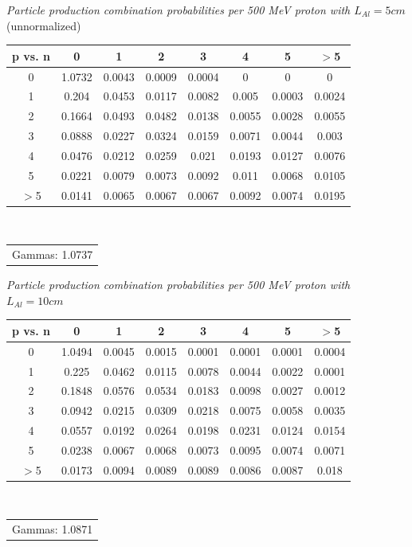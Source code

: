 \documentclass[11pt]{article}
\makeatletter
\newenvironment{tablehere}
{\def\@captype{table}}{}
\makeatother
\begin{document}
\vspace{0.15 cm}
\begin{tablehere}\begin{centering}
  \caption{\small \emph{Particle production combination probabilities per 500 MeV proton with $L_{Al}=5 cm$} (unnormalized)}
  \begin{tabular}{c || c c c c c c c}
    p vs. n & 0 & 1 & 2 & 3 & 4 & 5 & $>$5 \\
    \hline\hline
    0 & 1.0732 & 0.0043 & 0.0009 & 0.0004 & 0 & 0 & 0 \\
    1 & 0.204 & 0.0453 & 0.0117 & 0.0082 & 0.005 & 0.0003 & 0.0024 \\
    2 & 0.1664 & 0.0493 & 0.0482 & 0.0138 & 0.0055 & 0.0028 & 0.0055 \\
    3 & 0.0888 & 0.0227 & 0.0324 & 0.0159 & 0.0071 & 0.0044 & 0.003 \\
    4 & 0.0476 & 0.0212 & 0.0259 & 0.021 & 0.0193 & 0.0127 & 0.0076 \\
    5 & 0.0221 & 0.0079 & 0.0073 & 0.0092 & 0.011 & 0.0068 & 0.0105 \\
    $>$5 & 0.0141 & 0.0065 & 0.0067 & 0.0067 & 0.0092 & 0.0074 & 0.0195 \\
    \hline\hline
  \end{tabular} \\
  \begin{tabular}{r} Gammas: 1.0737 \end{tabular}
  \label{tab:production_pAl5}
\end{centering}\end{tablehere}
\vspace{0.15 cm}
\begin{tablehere}\begin{centering}
  \caption{\small \emph{Particle production combination probabilities per 500 MeV proton with $L_{Al}=10 cm$}}
  \begin{tabular}{c || c c c c c c c}
    p vs. n & 0 & 1 & 2 & 3 & 4 & 5 & $>$5 \\
    \hline\hline
    0 & 1.0494 & 0.0045 & 0.0015 & 0.0001 & 0.0001 & 0.0001 & 0.0004 \\
    1 & 0.225 & 0.0462 & 0.0115 & 0.0078 & 0.0044 & 0.0022 & 0.0001 \\
    2 & 0.1848 & 0.0576 & 0.0534 & 0.0183 & 0.0098 & 0.0027 & 0.0012 \\
    3 & 0.0942 & 0.0215 & 0.0309 & 0.0218 & 0.0075 & 0.0058 & 0.0035 \\
    4 & 0.0557 & 0.0192 & 0.0264 & 0.0198 & 0.0231 & 0.0124 & 0.0154 \\
    5 & 0.0238 & 0.0067 & 0.0068 & 0.0073 & 0.0095 & 0.0074 & 0.0071 \\
    $>$5 & 0.0173 & 0.0094 & 0.0089 & 0.0089 & 0.0086 & 0.0087 & 0.018 \\
    \hline\hline
  \end{tabular} \\
  \begin{tabular}{r} Gammas: 1.0871 \end{tabular}  
  \label{tab:production_pAl10}
\end{centering}\end{tablehere}
\end{document}
